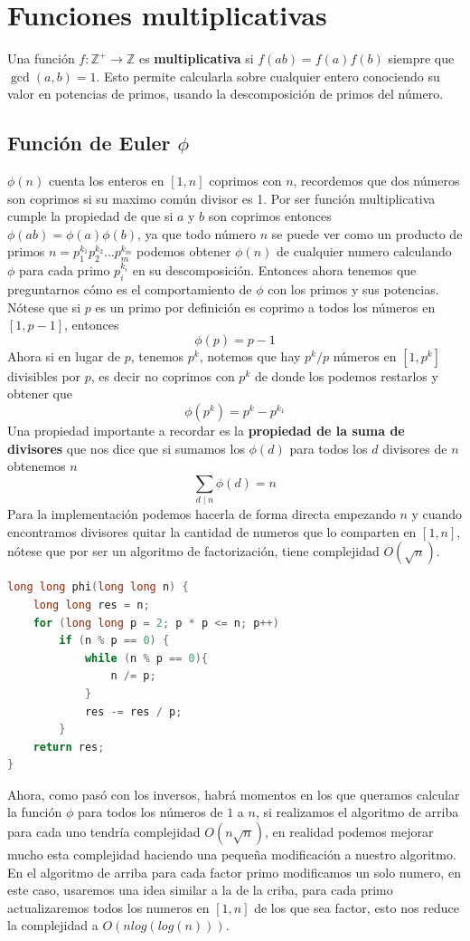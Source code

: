 \section{Funciones multiplicativas}
 
Una función $f: \mathbb{Z}^+ \to \mathbb{Z}$ es \textbf{multiplicativa} si $f(ab) = f(a)f(b)$ siempre que $\gcd(a,b) = 1$. Esto permite calcularla sobre cualquier entero conociendo su valor en potencias de primos, usando la descomposición de primos del número.
 
\subsection*{Función de Euler $\phi$}
 
$\phi(n)$ cuenta los enteros en $[1,n]$ coprimos con $n$, recordemos que dos números son coprimos si su maximo común divisor es 1. Por ser función multiplicativa cumple la propiedad de que si $a$ y $b$ son coprimos entonces $\phi(ab)=\phi(a)\phi(b)$, ya que todo número $n$ se puede ver como un producto de primos $n=p_1^{k_1}p_2^{k_2}...p_m^{k_m}$ podemos obtener $\phi(n)$ de cualquier numero calculando $\phi$ para cada primo $p_i^{k_i}$ en su descomposición. Entonces ahora tenemos que preguntarnos cómo es el comportamiento de $\phi$ con los primos y sus potencias. Nótese que si $p$ es un primo por definición es coprimo a todos los números en $[1,p-1]$, entonces 
\[\phi(p)=p-1\]
Ahora si en lugar de $p$, tenemos $p^k$, notemos que hay $p^k/p$ números en $[1,p^k]$ divisibles por $p$, es decir no coprimos con $p^k$ de donde los podemos restarlos y obtener que
\[\phi(p^k)=p^k-p^{k_1}\]
Una propiedad importante a recordar es la \textbf{propiedad de la suma de divisores} que nos dice que si sumamos los $\phi(d)$ para todos los $d$ divisores de $n$ obtenemos $n$
\[\sum_{d \mid n} \phi(d) = n\]
Para la implementación podemos hacerla de forma directa empezando $n$ y cuando encontramos divisores quitar la cantidad de numeros que lo comparten en $[1,n]$, nótese que por ser un algoritmo de factorización, tiene complejidad $O(\sqrt{n})$.
\begin{lstlisting}[language=C++]
long long phi(long long n) {
    long long res = n;
    for (long long p = 2; p * p <= n; p++)
        if (n % p == 0) {
            while (n % p == 0){
                n /= p;
            }
            res -= res / p;
        }
    return res;
}
\end{lstlisting}
Ahora, como pasó con los inversos, habrá momentos en los que queramos calcular la función $\phi$ para todos los números de $1$ a $n$, si realizamos el algoritmo de arriba para cada uno tendría complejidad $O(n\sqrt{n})$, en realidad podemos mejorar mucho esta complejidad haciendo una pequeña modificación a nuestro algoritmo. En el algoritmo de arriba para cada factor primo modificamos un solo numero, en este caso, usaremos una idea similar a la de la criba, para cada primo actualizaremos todos los numeros en $[1,n]$ de los que sea factor, esto nos reduce la complejidad a $O(n log(log(n)))$.
